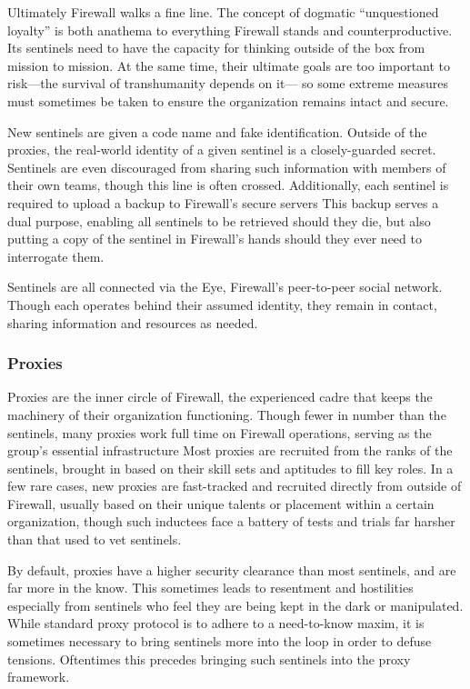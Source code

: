 Ultimately Firewall walks a fine line. The concept 
of dogmatic ``unquestioned loyalty'' is both anathema 
to everything Firewall stands and counterproductive. 
Its sentinels need to have the capacity for thinking 
outside of the box from mission to mission. At the 
same time, their ultimate goals are too important to 
risk—the survival of transhumanity depends on it—
so some extreme measures must sometimes be taken 
to ensure the organization remains intact and secure.

New sentinels are given a code name and fake 
identification. Outside of the proxies, the real-world 
identity of a given sentinel is a closely-guarded secret. 
Sentinels are even discouraged from sharing such information
with members of their own teams, though
this line is often crossed. Additionally, each sentinel is 
required to upload a backup to Firewall's secure servers
This backup serves a dual purpose, enabling all
sentinels to be retrieved should they die, but also putting
a copy of the sentinel in Firewall's hands should
they ever need to interrogate them.

Sentinels are all connected via the Eye, Firewall's 
peer-to-peer social network. Though each operates 
behind their assumed identity, they remain in contact, 
sharing information and resources as needed. 

\subsubsection{Proxies }

Proxies are the inner circle of Firewall, the experienced 
cadre that keeps the machinery of their organization
functioning. Though fewer in number than the
sentinels, many proxies work full time on Firewall 
operations, serving as the group's essential infrastructure
Most proxies are recruited from the ranks of the
sentinels, brought in based on their skill sets and aptitudes
to fill key roles. In a few rare cases, new proxies
are fast-tracked and recruited directly from outside 
of Firewall, usually based on their unique talents or 
placement within a certain organization, though such 
inductees face a battery of tests and trials far harsher 
than that used to vet sentinels.

By default, proxies have a higher security clearance
than most sentinels, and are far more in the
know. This sometimes leads to resentment and hostilities
especially from sentinels who feel they are
being kept in the dark or manipulated. While standard
proxy protocol is to adhere to a need-to-know
maxim, it is sometimes necessary to bring sentinels 
more into the loop in order to defuse tensions. Oftentimes
this precedes bringing such sentinels into
the proxy framework.

